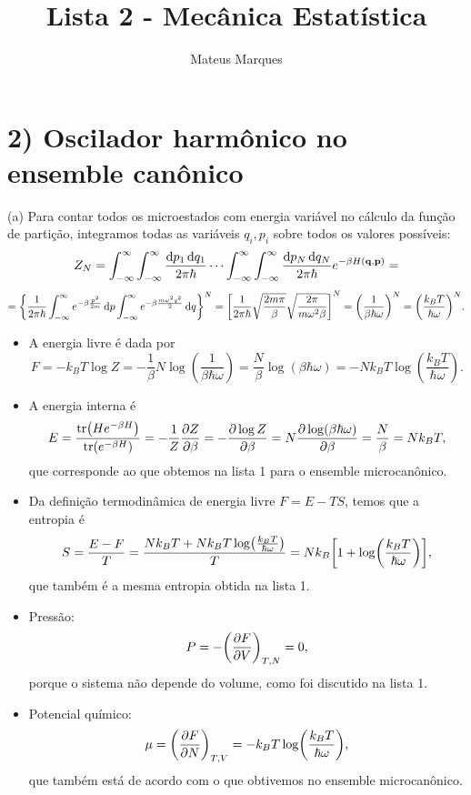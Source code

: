 \documentclass[a4paper,10pt]{article}
\title{\Huge{\textbf{Lista 2 - Mecânica Estatística}}}
\author{Mateus Marques}
\begin{document}
\maketitle

\section*{2) Oscilador harmônico no ensemble canônico}

(a) Para contar todos os microestados com energia variável no cálculo da função de partição, integramos todas as variáveis $q_i, p_i$ sobre todos os valores possíveis:
$$
Z_N = \int_{-\infty}^{\infty}\int_{-\infty}^{\infty} \frac{\dd{p_1} \dd{q_1}}{2\pi\hbar} \cdots \int_{-\infty}^{\infty}\int_{-\infty}^{\infty} \frac{\dd{p_N} \dd{q_N}}{2\pi\hbar} e^{-\beta H(\vb{q}, \vb{p})} =
$$
$$
= \qty{\frac{1}{2\pi\hbar} \int_{-\infty}^{\infty} e^{-\beta \frac{p^2}{2m}} \dd{p} \int_{-\infty}^{\infty} e^{-\beta \frac{m\omega^2q^2}{2} }\dd{q}}^N =
\qty[ \frac{1}{2\pi\hbar} \sqrt{\frac{2m\pi}{\beta}} \sqrt{\frac{2\pi}{m\omega^2\beta}} ]^N =
\qty(\frac{1}{\beta \hbar \omega})^N = \qty(\frac{k_B T}{\hbar \omega})^N.
$$

\begin{itemize}
\item A energia livre é dada por
$$
F = - k_B T \log Z = -\frac{1}{\beta} N \log(\frac{1}{\beta \hbar \omega}) = \frac{N}{\beta} \log(\beta\hbar\omega) =
-N k_B T \log(\frac{k_B T}{\hbar \omega}).
$$

\item A energia interna é
$$
E = \frac{\tr(H e^{-\beta H})}{\tr(e^{-\beta H})} = - \frac{1}{Z} \pdv{Z}{\beta} = - \pdv{\log Z}{\beta} =
N\pdv{\log(\beta\hbar\omega)}{\beta} = \frac{N}{\beta} = N k_B T,
$$
que corresponde ao que obtemos na lista 1 para o ensemble microcanônico.

\item Da definição termodinâmica de energia livre $F = E - TS$, temos que a entropia é
$$
S = \frac{E-F}{T} = \frac{N k_B T + N k_B T \log(\frac{k_B T}{\hbar\omega})}{T} = N k_B \qty[1 + \log(\frac{k_B T}{\hbar\omega})],
$$
que também é a mesma entropia obtida na lista 1.

\item Pressão:
$$
P = -\qty(\pdv{F}{V})_{T,N} = 0,
$$
porque o sistema não depende do volume, como foi discutido na lista 1.

\item Potencial químico:
$$
\mu = \qty(\pdv{F}{N})_{T,V} = - k_B T \log(\frac{k_B T}{\hbar\omega}),
$$
que também está de acordo com o que obtivemos no ensemble microcanônico.
\end{itemize}
\end{document}
